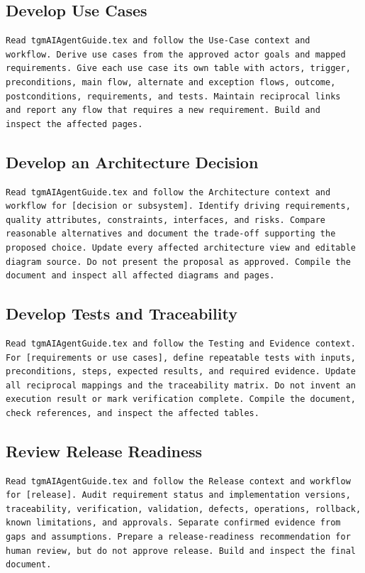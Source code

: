 \subsection{Develop Use Cases}
\begin{verbatim}
Read tgmAIAgentGuide.tex and follow the Use-Case context and
workflow. Derive use cases from the approved actor goals and mapped
requirements. Give each use case its own table with actors, trigger,
preconditions, main flow, alternate and exception flows, outcome,
postconditions, requirements, and tests. Maintain reciprocal links
and report any flow that requires a new requirement. Build and
inspect the affected pages.
\end{verbatim}

\newpage
\subsection{Develop an Architecture Decision}
\thispagestyle{fancy}
\begin{verbatim}
Read tgmAIAgentGuide.tex and follow the Architecture context and
workflow for [decision or subsystem]. Identify driving requirements,
quality attributes, constraints, interfaces, and risks. Compare
reasonable alternatives and document the trade-off supporting the
proposed choice. Update every affected architecture view and editable
diagram source. Do not present the proposal as approved. Compile the
document and inspect all affected diagrams and pages.
\end{verbatim}

\subsection{Develop Tests and Traceability}
\begin{verbatim}
Read tgmAIAgentGuide.tex and follow the Testing and Evidence context.
For [requirements or use cases], define repeatable tests with inputs,
preconditions, steps, expected results, and required evidence. Update
all reciprocal mappings and the traceability matrix. Do not invent an
execution result or mark verification complete. Compile the document,
check references, and inspect the affected tables.
\end{verbatim}

\subsection{Review Release Readiness}
\begin{verbatim}
Read tgmAIAgentGuide.tex and follow the Release context and workflow
for [release]. Audit requirement status and implementation versions,
traceability, verification, validation, defects, operations, rollback,
known limitations, and approvals. Separate confirmed evidence from
gaps and assumptions. Prepare a release-readiness recommendation for
human review, but do not approve release. Build and inspect the final
document.
\end{verbatim}

